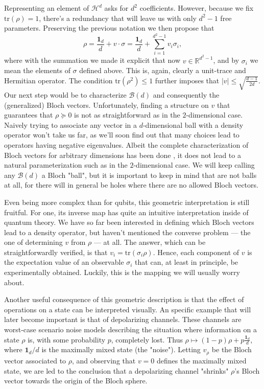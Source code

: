 		Representing an element of $\mathcal{H}^d$ asks for $d^2$ coefficients. However, because we fix $\text{tr}(\rho) = 1$, there's a redundancy that will leave us with only $d^2 - 1$ free parameters. Preserving the previous notation we then propose that
		$$
			\rho = \frac{\mathbf{1}_d}{d} + v \cdot \sigma = \frac{\mathbf{1}_d}{d} + \sum_{i = 1}^{d^2 - 1} v_i \sigma_i ,
			\label{eq:gell-mann-representation}
		$$
		where with the summation we made it explicit that now $v \in \mathbb{R}^{d^2 - 1}$, and by $\sigma_i$ we mean the elements of $\sigma$ defined above. This is, again, clearly a unit-trace and Hermitian operator. The condition $\text{tr}(\rho^2) \leq 1$ further imposes that $\lvert v \rvert \leq \sqrt{\frac{d - 1}{2d}}$. Our next step would be to characterize $\mathcal{B}(d)$ and consequently the (generalized) Bloch vectors. Unfortunately, finding a structure on $v$ that guarantees that $\rho \succeq 0$ is not as straightforward as in the $2$-dimensional case. Naively trying to associate any vector in a $d$-dimensional ball with a density operator won't take us far, as we'll soon find out that many choices lead to operators having negative eigenvalues. Albeit the complete characterization of Bloch vectors for arbitrary dimensions has been done \cite{kimura_2003_bloch}, it does not lead to a natural parameterization such as in the $2$-dimensional case. We will keep calling any $\mathcal{B}(d)$ a Bloch "ball", but it is important to keep in mind that are not balls at all, for there will in general be holes where there are no allowed Bloch vectors.

		Even being more complex than for qubits, this geometric interpretation is still fruitful. For one, its inverse map has quite an intuitive interpretation inside of quantum theory. We have so far been interested in defining which Bloch vectors lead to a density operator, but haven't mentioned the converse problem --- the one of determining $v$ from $\rho$ --- at all. The answer, which can be straightforwardly verified, is that $v_i = \text{tr}(\sigma_i \rho)$. Hence, each component of $v$ is the expectation value of an observable $\sigma_i$ that can, at least in principle, be experimentally obtained. Luckily, this is the mapping we will usually worry about.

		Another useful consequence of this geometric description is that the effect of operations on a state can be interpreted visually. An specific example that will later become important is that of depolarizing channels. These channels are worst-case scenario noise models describing the situation where information on a state $\rho$ is, with some probability $p$, completely lost. Thus $\rho \mapsto (1 - p) \rho + p \frac{\mathbf{1}_d}{d}$, where $\mathbf{1}_d/d$ is the maximally mixed state (the "noise"). Letting $v_\rho$ be the Bloch vector associated to $\rho$, and observing that $v = 0$ defines the maximally mixed state, we are led to the conclusion that a depolarizing channel "shrinks" $\rho$'s Bloch vector towards the origin of the Bloch sphere.

